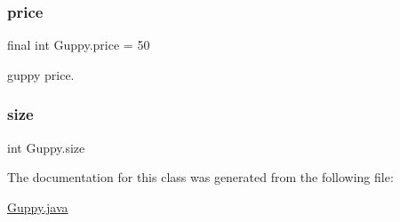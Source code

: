 \mbox{\label{class_guppy_a711b1ce05b2a4e55af2bbab10876a56d}} 
\subsubsection{\texorpdfstring{price}{price}}
{\footnotesize\ttfamily final int Guppy.\+price = 50\hspace{0.3cm}{\ttfamily [static]}}

guppy price. \mbox{\label{class_guppy_a2424f5424eb13aab67ee61d0876aaf25}} 
\subsubsection{\texorpdfstring{size}{size}}
{\footnotesize\ttfamily int Guppy.\+size\hspace{0.3cm}{\ttfamily [private]}}



The documentation for this class was generated from the following file\+:\begin{DoxyCompactItemize}
\item 
\mbox{\hyperlink{_guppy_8java}{Guppy.\+java}}\end{DoxyCompactItemize}
